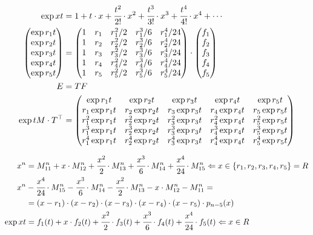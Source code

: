 \documentclass[12pt,a4paper]{article}
\begin{document}
\begin{align}
\exp xt &= 1 + t\cdot x + \cfrac{t^2}{2!}\cdot x^2 + \cfrac{t^3}{3!}\cdot x^3 + \cfrac{t^4}{4!}\cdot x^4 + \cdots \\
\left(\begin{matrix}\exp{r_1 t} \\ \exp{r_2 t} \\ \exp{r_3 t} \\ \exp{r_4 t} \\ \exp{r_5 t} \end{matrix}\right) &= \left(\begin{matrix}1 & r_1 & {r_1^2}/{2} & {r_1^3}/{6} & {r_1^4}/{24} \\ 1 & r_2 & {r_2^2}/{2} & {r_2^3}/{6} & {r_2^4}/{24} \\ 1 & r_3 & {r_3^2}/{2} & {r_3^3}/{6} & {r_3^4}/{24} \\ 1 & r_4 & {r_4^2}/{2} & {r_4^3}/{6} & {r_4^4}/{24} \\ 1 & r_5 & {r_5^2}/{2} & {r_5^3}/{6} & {r_5^4}/{24} \end{matrix}\right) \cdot \left(\begin{matrix}f_1 \\ f_2 \\ f_3 \\ f_4 \\ f_5 \end{matrix}\right) \\
E &= T F \\
\exp tM \cdot T^\top &= \left(\begin{matrix}\exp{r_1 t} & \exp{r_2 t} & \exp{r_3 t} & \exp{r_4 t} & \exp{r_5 t} \\ r_1 \exp{r_1 t} & r_2 \exp{r_2 t} & r_3 \exp{r_3 t} & r_4 \exp{r_4 t} & r_5 \exp{r_5 t}  \\ r_1^2 \exp{r_1 t} & r_2^2 \exp{r_2 t} & r_3^2 \exp{r_3 t} & r_4^2 \exp{r_4 t} & r_5^2 \exp{r_5 t} \\ r_1^3 \exp{r_1 t} & r_2^3 \exp{r_2 t} & r_3^3 \exp{r_3 t} & r_4^3 \exp{r_4 t} & r_5^3 \exp{r_5 t}  \\ r_1^4 \exp{r_1 t} & r_2^4 \exp{r_2 t} & r_3^4 \exp{r_3 t} & r_4^4 \exp{r_4 t} & r_5^4 \exp{r_5 t}  \end{matrix}\right)
 \end{align}

\begin{align}
x^n &= M_{11}^n + x \cdot M_{12}^n + \cfrac{x^2}{2} \cdot M_{13}^n + \cfrac{x^3}{6} \cdot M_{14}^n + \cfrac{x^4}{24} \cdot M_{15}^n \Leftarrow  x \in \{ r_1, r_2, r_3, r_4, r_5 \} = R \\
x^n &- \cfrac{x^4}{24} \cdot M_{15}^n - \cfrac{x^3}{6} \cdot M_{14}^n - \cfrac{x^2}{2} \cdot M_{13}^n - x \cdot M_{12}^n - M_{11}^n = \\
&= (x - r_1) \cdot (x - r_2) \cdot (x - r_3) \cdot (x - r_4) \cdot (x - r_5) \cdot p_{n - 5}(x) \\
\exp xt &= f_1(t) + x\cdot f_2(t) + \cfrac{x^2}{2} \cdot f_3(t) + \cfrac{x^3}{6} \cdot f_4(t) + \cfrac{x^4}{24} \cdot f_5(t) \Leftarrow x \in R
\end{align}
\end{document}
